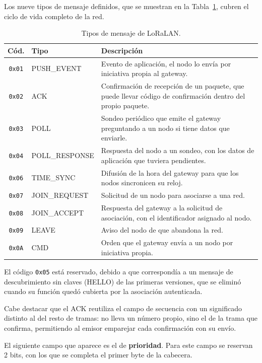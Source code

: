 Los nueve tipos de mensaje definidos, que se muestran en la Tabla~\ref{tab:tipos}, cubren el ciclo de vida completo de la red.
\begin{table}[H]
\centering
\caption{\label{tab:tipos} Tipos de mensaje de LoRaLAN.}
\small
\begin{tabular}{|c|l|p{8.5cm}|}
\hline
\textbf{Cód.} & \textbf{Tipo} & \textbf{Descripción} \\
\hline
\texttt{0x01} & PUSH\_EVENT & Evento de aplicación, el nodo lo envía por iniciativa propia al gateway. \\
\hline
\texttt{0x02} & ACK & Confirmación de recepción de un paquete, que puede llevar código de confirmación dentro del propio paquete. \\
\hline
\texttt{0x03} & POLL & Sondeo periódico que emite el gateway preguntando a un nodo si tiene datos que enviarle. \\
\hline
\texttt{0x04} & POLL\_RESPONSE & Respuesta del nodo a un sondeo, con los datos de aplicación que tuviera pendientes. \\
\hline
\texttt{0x06} & TIME\_SYNC & Difusión de la hora del gateway para que los nodos sincronicen su reloj. \\
\hline
\texttt{0x07} & JOIN\_REQUEST & Solicitud de un nodo para asociarse a una red. \\
\hline
\texttt{0x08} & JOIN\_ACCEPT & Respuesta del gateway a la solicitud de asociación, con el identificador asignado al nodo. \\
\hline
\texttt{0x09} & LEAVE & Aviso del nodo de que abandona la red. \\
\hline
\texttt{0x0A} & CMD & Orden que el gateway envía a un nodo por iniciativa propia. \\
\hline
\end{tabular}
\end{table}


El código \texttt{0x05} está reservado, debido a que correspondía a un mensaje de descubrimiento sin claves (HELLO) de las primeras versiones, que se eliminó cuando su función quedó cubierta por la asociación autenticada. 

Cabe destacar que el ACK reutiliza el campo de secuencia con un significado distinto al del resto de tramas: no lleva un número propio, sino el de la trama que confirma, permitiendo al emisor emparejar cada confirmación con su envío.

El siguiente campo que aparece es el de \textbf{prioridad}. Para este campo se reservan 2 bits, con los que se completa el primer byte de la cabecera.

